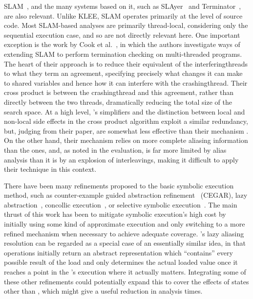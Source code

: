 SLAM~\cite{Ball2011}, and the many systems based on it, such as
SLAyer~\cite{Berdine2011} and Terminator~\cite{Cook2006a}, are also
relevant.  Unlike KLEE, SLAM operates primarily at the level of source
code.  Most SLAM-based analyses are primarily thread-local,
considering only the sequential execution case, and so are not
directly relevant here.  One important exception is the work by Cook
et al.~\cite{Cook2007}, in which the authors investigate ways of
extending SLAM to perform termination checking on multi-threaded
programs.  The heart of their approach is to reduce their equivalent
of the \glspl{interferingthread} to what they term an agreement,
specifying precisely what changes it can make to shared variables and
hence how it can interfere with the \gls{crashingthread}.  Their cross
product is between the \gls{crashingthread} and this agreement, rather
than directly between the two threads, dramatically reducing the total
size of the search space.  At a high level, {\technique}'s simplifiers
and the distinction between local and non-local side effects in the
cross product algorithm exploit a similar redundancy, but, judging
from their paper, are somewhat less effective than their mechanism
.  On the other hand, their mechanism relies on more
complete aliasing information than the {\technique} ones, and, as
noted in the evaluation, {\technique} is far more limited by alias
analysis than it is by an explosion of interleavings, making it
difficult to apply their technique in this context.

There have been many refinements proposed to the basic symbolic
execution method, such as counter-example guided abstraction
refinement~\cite{Clarke2003} (CEGAR), lazy
abstraction~\cite{Henzinger2002}, concollic execution~\cite{Sen2005},
or selective symbolic execution~\cite{Chipounov2011}.  The main thrust
of this work has been to mitigate symbolic execution's high cost by
initially using some kind of approximate execution and only switching
to a more refined mechanism when necessary to achieve adequate
coverage.  {\Technique}'s lazy aliasing resolution can be regarded as
a special case of an essentially similar idea, in that 
operations initially return an abstract representation which
``contains'' every possible result of the load and {\technique} only
determines the actual loaded value once it reaches a point in the
{\StateMachine}'s execution where it actually matters.  Integrating
some of these other refinements could potentially expand this to cover
the effects of states other than , which might give a
useful reduction in analysis times.

